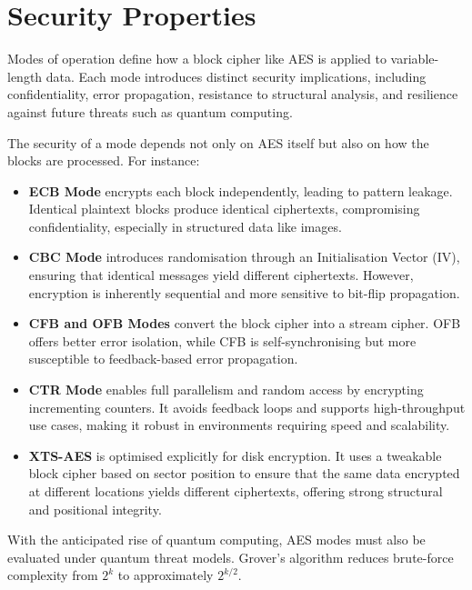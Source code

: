 \section{Security Properties}

Modes of operation define how a block cipher like AES is applied to variable-length data. 
Each mode introduces distinct security implications, 
including confidentiality, error propagation, resistance to structural analysis, 
and resilience against future threats such as quantum computing.

\noindent The security of a mode depends not only on AES itself but also on how the blocks are processed. 
For instance:

\begin{itemize}
    \item \textbf{ECB Mode} encrypts each block independently, leading to pattern leakage. Identical plaintext blocks produce identical ciphertexts, compromising confidentiality, especially in structured data like images.
    
    \item \textbf{CBC Mode} introduces randomisation through an Initialisation Vector (IV), ensuring that identical messages yield different ciphertexts. However, encryption is inherently sequential and more sensitive to bit-flip propagation.
    
    \item \textbf{CFB and OFB Modes} convert the block cipher into a stream cipher. OFB offers better error isolation, while CFB is self-synchronising but more susceptible to feedback-based error propagation.
    
    \item \textbf{CTR Mode} enables full parallelism and random access by encrypting incrementing counters. It avoids feedback loops and supports high-throughput use cases, making it robust in environments requiring speed and scalability.
    
    \item \textbf{XTS-AES} is optimised explicitly for disk encryption. It uses a tweakable block cipher based on sector position to ensure that the same data encrypted at different locations yields different ciphertexts, offering strong structural and positional integrity.
\end{itemize}

\noindent With the anticipated rise of quantum computing, 
AES modes must also be evaluated under quantum threat models. 
Grover’s algorithm reduces brute-force complexity from $2^k$ to approximately $2^{k/2}$. \newline

